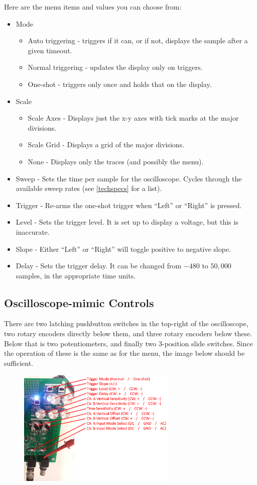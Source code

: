 Here are the menu items and values you can choose from:
\begin{itemize}
	\item Mode
		\begin{itemize}
			\item Auto triggering - triggers if it can, or if not, displays the sample after a given timeout.
			\item Normal triggering - updates the display only on triggers.
			\item One-shot - triggers only once and holds that on the display.
		\end{itemize}
	\item Scale
		\begin{itemize}
			\item Scale Axes - Displays just the x-y axes with tick marks at the major divisions.
			\item Scale Grid - Displays a grid of the major divisions.
			\item None - Displays only the traces (and possibly the menu).
		\end{itemize}
	\item Sweep - Sets the time per sample for the oscilloscope. Cycles through the available sweep rates (see \ref{techspecs} for a list).
	\item Trigger - Re-arms the one-shot trigger when ``Left'' or ``Right'' is pressed.
	\item Level - Sets the trigger level. It is set up to display a voltage, but this is inaccurate.
	\item Slope - Either ``Left'' or ``Right'' will toggle positive to negative slope.
	\item Delay - Sets the trigger delay. It can be changed from $-480$ to $50,000$ samples, in the appropriate time units.
\end{itemize}

\subsection{Oscilloscope-mimic Controls}
There are two latching pushbutton switches in the top-right of the oscilloscope, two rotary encoders directly below them, and three rotary encoders below these. Below that is two potentiometers, and finally two 3-position slide switches. Since the operation of these is the same as for the menu, the image below should be sufficient.

\begin{figure}[ht!]
    \centering
    \includegraphics[width=3in]{images/hardware_buttons.png}
\end{figure}

